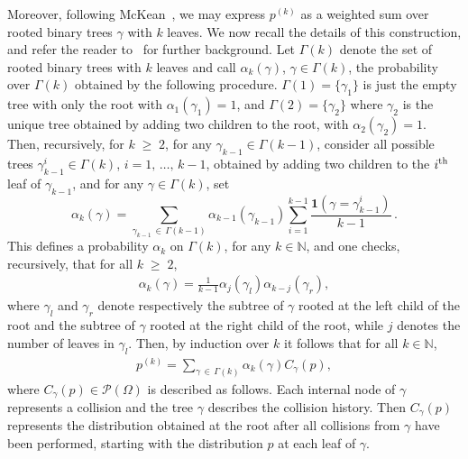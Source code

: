 \documentclass[AHL,Unicode,longabstracts,published]{cedram}
\renewcommand{\geq}{\;\geqslant\;}
\newcommand{\ind}{\mathbf{1}}
\newcommand{\cP}{\mathcal{P}}
\newcommand{\bbN}{\mathbb{N}}
\let\a=\alpha
\let\g=\gamma
\let\G=\Gamma
\let\O=\Omega
\begin{document}
Moreover, following McKean~\cite{mckean}, we may express $p^{(k)}$ as a weighted sum over rooted binary trees $\g$ with $k$ leaves. We now recall the details of this construction, and refer the reader to~\cite{carlenwild} for further background. Let $\G(k)$ denote the set of rooted binary trees with $k$ leaves and call $\alpha_k(\gamma)$, $\g\in\G(k)$, the probability over $\G(k)$ obtained by the following procedure. $\G(1)=\{\g_1\}$ is just the empty tree with only the root with $\a_1(\g_1)=1$, and $\G(2)=\{\g_2\}$ where $\g_2$ is the unique tree obtained by adding two children to the root, with $\a_2(\g_2)=1$. Then, recursively, for $k\geq 2$, for any $\g_{k-1}\in\G(k-1)$, consider all possible trees $\g_{k-1}^i\in\G(k)$, $i=1,\,\dots,\,k-1$, obtained by adding two children to the $i^{\rm th}$ leaf of $\g_{k-1}$, and for any $\g\in\G(k)$, set
\[
\a_k(\g)=\sum_{\g_{k-1}\,\in\,\G(k-1)}\a_{k-1}(\g_{k-1})\sum_{i=1}^{k-1} \frac{\ind\left(\g=\g_{k-1}^i\right)}{k-1}\,.
\]
This defines a probability $\a_k$ on $\G(k)$, for any $k\in\bbN$, and one checks, recursively, that for all $k\geq 2$,
\begin{align}\label{eqreca}
\a_k(\g)=\frac1{k-1}\a_j(\g_l)\a_{k-j}(\g_r),
\end{align}
where $\g_l$ and $\g_r$ denote respectively the subtree of $\g$ rooted at the left child of the root and the subtree of $\g$ rooted at the right child of the root, while $j$ denotes the number of leaves in $\g_l$. Then, by induction over $k$ it follows that for all $k\in\bbN$,
\begin{align}\label{eq00}
p^{(k)} = \sum_{\g\,\in\,\Gamma(k)}\alpha_k(\g)C_{\gamma}(p),
\end{align}
where $C_{\gamma}(p)\in\cP(\O)$ is described as follows. Each internal node of $\g$ represents a collision and the tree $\g$ describes the collision history. Then $C_\g(p)$ represents the distribution obtained at the root after all collisions from $\g$ have been performed, starting with the distribution $p$ at each leaf of $\g$.
\end{document}
